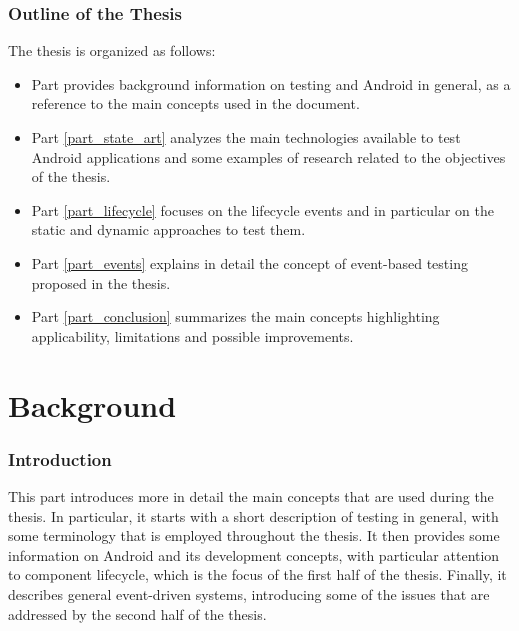 \documentclass[11pt,a4paper,notitlepage]{article}
\begin{document}
\section{Outline of the Thesis}
The thesis is organized as follows:
\begin{itemize}
	\item Part \ref{part_background} provides background information on testing and Android in general, as a reference to the main concepts used in the document.
	\item Part \ref{part_state_art} analyzes the main technologies available to test Android applications and some examples of research related to the objectives of the thesis.
	\item Part \ref{part_lifecycle} focuses on the lifecycle events and in particular on the static and dynamic approaches to test them.
	\item Part \ref{part_events} explains in detail the concept of event-based testing proposed in the thesis.
	\item Part \ref{part_conclusion} summarizes the main concepts highlighting applicability, limitations and possible improvements.
\end{itemize}



\newpage
\part{Background}\label{part_background}

\section{Introduction}
This part introduces more in detail the main concepts that are used during the thesis. In particular, it starts with a short description of testing in general, with some terminology that is employed throughout the thesis. It then provides some information on Android and its development concepts, with particular attention to component lifecycle, which is the focus of the first half of the thesis. Finally, it describes general event-driven systems, introducing some of the issues that are addressed by the second half of the thesis.
\end{document}
